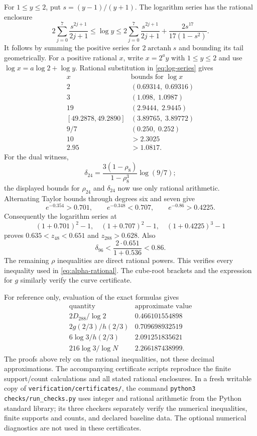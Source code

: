 \documentclass[11pt]{article}
\numberwithin{equation}{section}
\theoremstyle{definition}
\theoremstyle{remark}
\begin{document}
For \(1\le y\le2\), put \(s=(y-1)/(y+1)\).
The logarithm series has the rational enclosure
\begin{equation}\label{eq:log-series}
 2\sum_{j=0}^7\frac{s^{2j+1}}{2j+1}
 \le\log y\le
 2\sum_{j=0}^7\frac{s^{2j+1}}{2j+1}
       +\frac{2s^{17}}{17(1-s^2)}.
\end{equation}
It follows by summing the positive series for
\(2\operatorname{arctanh}s\) and bounding its tail geometrically.
For a positive rational \(x\), write \(x=2^a y\) with \(1\le y\le2\)
and use \(\log x=a\log2+\log y\).
Rational substitution in \eqref{eq:log-series} gives
\[
\begin{array}{c|c}
x&\text{bounds for }\log x\\ \hline
2&(0.69314,\;0.69316)\\
3&(1.098,\;1.0987)\\
19&(2.9444,\;2.9445)\\
{[49.2878,49.2890]}&(3.89765,\;3.89772)\\
9/7&(0.250,\;0.252)\\
10&>2.3025\\
2.95&>1.0817.
\end{array}
\]
For the dual witness,
\[
 \delta_{24}=
 \frac{3(1-\rho_8)}{1-\rho_8^3}\log(9/7);
\]
the displayed bounds for \(\rho_{24}\) and \(\delta_{24}\) now use
only rational arithmetic.
Alternating Taylor bounds through degrees six and seven give
\[
 e^{-0.354}>0.701,\qquad
 e^{-0.348}<0.707,\qquad
 e^{-0.86}>0.4225.
\]
Consequently the logarithm series at
\[
 (1+0.701)^2-1,\quad
 (1+0.707)^2-1,\quad
 (1+0.4225)^3-1
\]
proves \(0.635<z_{48}<0.651\) and \(z_{288}>0.628\).
Also
\[
 \delta_{96}<\frac{2\cdot0.651}{1+0.536}<0.86.
\]
The remaining \(\rho\) inequalities are direct rational powers.
This verifies every inequality used in \eqref{eq:alpha-rational}.
The cube-root brackets and the expression for \(g\) similarly verify
the curve certificate.

For reference only, evaluation of the exact formulas gives
\[
\begin{array}{c|c}
\text{quantity}&\text{approximate value}\\ \hline
2D_{288}/\log2&0.466101554898\\
2g(2/3)/h(2/3)&0.709698932519\\
6\log3/h(2/3)&2.091251835621\\
216\log3/\log N&2.266187438999.
\end{array}
\]
The proofs above rely on the rational inequalities, not these decimal
approximations.
The accompanying certificate scripts reproduce the finite
support/count calculations and all stated rational enclosures.
In a fresh writable copy of \texttt{verification/certificates/}, the command
\texttt{python3 checks/run\_checks.py}
uses integer and rational arithmetic from the Python standard library;
its three checkers separately verify the numerical inequalities,
finite supports and counts, and declared baseline data.
The optional numerical diagnostics are not used in these certificates.
\end{document}
